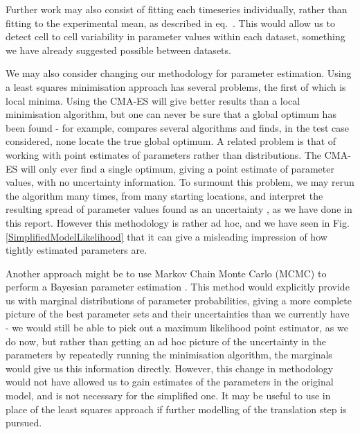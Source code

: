 \documentclass[10pt,journal]{./IEEE_latex_class/IEEEtran}
\renewcommand{\eqref}{eq.~\originaleqref}
\begin{document}
Further work may also consist of fitting each timeseries individually, rather than fitting to the experimental mean, as described in \eqref{eq:min}. This would allow us to detect cell to cell variability in parameter values within each dataset, something we have already suggested possible between datasets.

We may also consider changing our methodology for parameter estimation. Using a least squares minimisation approach has several problems, the first of which is local minima. Using the CMA-ES will give better results than a local minimisation algorithm, but one can never be sure that a global optimum has been found - for example, \cite{Algorithms2003} compares several algorithms and finds, in the test case considered, none locate the true global optimum.
A related problem is that of working with point estimates of parameters rather than distributions. The CMA-ES will only ever find a single optimum, giving a point estimate of parameter values, with no uncertainty information. To surmount this problem, we may rerun the algorithm many times, from many starting locations, and interpret the resulting spread of parameter values found as an uncertainty \cite{Hu2015}, as we have done in this report. However this methodology is rather ad hoc, and we have seen in Fig. \ref{SimplifiedModelLikelihood} that it can give a misleading impression of how tightly estimated parameters are.

Another approach might be to use Markov Chain Monte Carlo (MCMC) to perform a Bayesian parameter estimation \cite{Jitjareonchai2006,Andrieu2003}. This method would explicitly provide us with marginal distributions of parameter probabilities, giving a more complete picture of the best parameter sets and their uncertainties than we currently have - we would still be able to pick out a maximum likelihood point estimator, as we do now, but rather than getting an ad hoc picture of the uncertainty in the parameters by repeatedly running the minimisation algorithm, the marginals would give us this information directly. However, this change in methodology would not have allowed us to gain estimates of the parameters in the original model, and is not necessary for the simplified one. It may be useful to use in place of the least squares approach if further modelling of the translation step is pursued.

\begin{footnotesize}


\end{footnotesize}
\clearpage
\onecolumn
\end{document}
